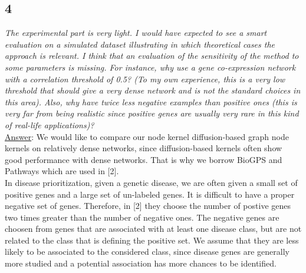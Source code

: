 \documentclass[11pt]{article}
\begin{document}
\subsection*{4} \textit{The experimental part is very light. I would have expected to see a smart evaluation on a simulated dataset illustrating in which theoretical cases the approach is relevant. I think that an evaluation of the sensitivity of the method to some parameters is missing. For instance, why use a gene co-expression network with a correlation threshold of 0.5? (To my own experience, this is a very low threshold that should give a very dense network and is not the standard choices in this area). Also, why have twice less negative examples than positive ones (this is very far from being realistic since positive genes are usually very rare in this kind of real-life applications)?} \\

\underline{Answer}: We would like to compare our node kernel diffusion-based graph node kernels on relatively dense networks, since diffusion-based kernels often show good performance with dense networks. That is why we borrow BioGPS and Pathways which are used in [2]. \\

In disease prioritization, given a genetic disease, we are often given a small set of positive genes and a large set of un-labeled genes. It is difficult to have a proper negative set of genes. Therefore, in [2] they choose the number of postive genes two times greater than the number of negative ones. The negative genes are choosen from genes that are associated with at least one disease class, but are not related to the class that is defining the positive set. We assume that they are less likely to be associated to the considered class, since disease genes are generally more studied and a potential association has more chances to be identified.
\end{document}
